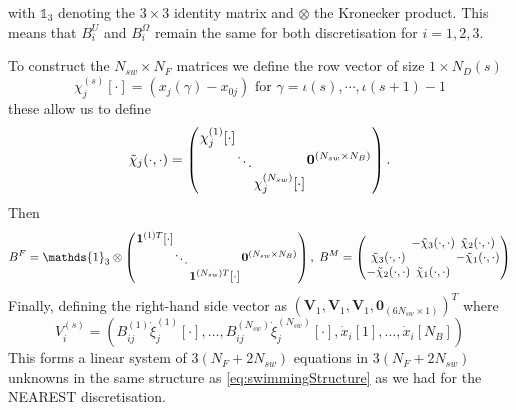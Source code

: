 with $\mathds{1}_{3}$ denoting the $3\times3$ identity matrix and $\otimes$ the Kronecker product. This means that $B^U_i$ and $B_i^\Omega$ remain the same for both discretisation for $i=1,2,3$. 

To construct the $N_{sw} \times N_F$ matrices we define the row vector of size $1 \times N_D(s)$ 
\begin{equation*}
    \chi_j^{(s)}[\cdot] = (x_j(\gamma) - x_{0 j}) \text{ for } \gamma = \iota(s),\cdots,\iota(s+1)-1
\end{equation*}
these allow us to define
\begin{equation*}
\arraycolsep=0.4pt\def\arraystretch{1}
    \tilde{\chi}_j(\cdot,\cdot)=\left(\begin{array}{cc}
         \begin{array}{ccc}
             \chi_j^{(1)}[\cdot] & & \\
              & \ddots & \\
              & & \chi_j^{(N_{sw})}[\cdot]
         \end{array} & \bm{0}^{(N_{sw} \times N_B)}
    \end{array}\right).
\end{equation*}
Then
\begin{equation*}
\arraycolsep=0.4pt\def\arraystretch{1}
    B^F = \mathds{1}_{3} \otimes \left(\begin{array}{cc}
         \begin{array}{ccc}
             \bm{1}^{(1)T}[\cdot] & & \\
              & \ddots & \\
              & & \bm{1}^{(N_{sw})T}[\cdot]
         \end{array} & \bm{0}^{(N_{sw} \times N_B)}
    \end{array}\right), \;
    B^M =
    \left(\begin{array}{ccc}
             & -\tilde{\chi}_3(\cdot,\cdot) & \tilde{\chi}_2(\cdot,\cdot)\\
            \tilde{\chi}_3(\cdot,\cdot) & & -\tilde{\chi}_1(\cdot,\cdot)\\
            -\tilde{\chi}_2(\cdot,\cdot) & \tilde{\chi}_1(\cdot,\cdot) &
          \end{array}\right)
\end{equation*}
Finally, defining the right-hand side vector as $(\bm{V}_1,\bm{V}_1,\bm{V}_1,\bm{0}_{(6N_{sw} \times 1)})^T$ where
\begin{equation*}
    V_i^{(s)} = (B_{ij}^{(1)}\dot{\xi}_j^{(1)}[\cdot],\dots,B_{ij}^{(N_{sw})}\dot{\xi}_j^{(N_{sw})}[\cdot],\dot{x}_i[1],\dots,\dot{x}_i[N_B])
\end{equation*}
This forms a linear system of $3(N_F+2N_{sw})$ equations in $3(N_F+2N_{sw})$ unknowns in the same structure as \cref{eq:swimmingStructure} as we had for the NEAREST discretisation.

